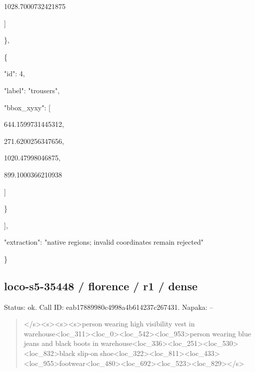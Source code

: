 \documentclass[10pt,a4paper]{article}
\begin{document}
        1028.7000732421875\par
      ]\par
    \},\allowbreak{}\par
    \{\par
      "id":\allowbreak{} 4,\allowbreak{}\par
      "label":\allowbreak{} "trousers",\allowbreak{}\par
      "bbox\_xyxy":\allowbreak{} [\par
        644.1599731445312,\allowbreak{}\par
        271.6200256347656,\allowbreak{}\par
        1020.47998046875,\allowbreak{}\par
        899.1000366210938\par
      ]\par
    \}\par
  ],\allowbreak{}\par
  "extraction":\allowbreak{} "native regions; invalid coordinates remain rejected"\par
\}
\subsection*{loco-s5-35448 / florence / r1 / dense}
Status: ok. Call ID: eab17889980c4998a4b614237c267431. Napaka: --
\begin{quote}\footnotesize
</s>\allowbreak{}<s>\allowbreak{}<s>\allowbreak{}<s>\allowbreak{}person wearing high visibility vest in warehouse<loc\_311>\allowbreak{}<loc\_0>\allowbreak{}<loc\_54\allowbreak{}2>\allowbreak{}<loc\_953>\allowbreak{}person wearing blue jeans and black boots in warehouse<loc\_336>\allowbreak{}<loc\_251>\allowbreak{}<loc\_\allowbreak{}530>\allowbreak{}<loc\_832>\allowbreak{}black slip-on shoe<loc\_322>\allowbreak{}<loc\_811>\allowbreak{}<loc\_433>\allowbreak{}<\allowbreak{}loc\_955>\allowbreak{}footwear<loc\_480>\allowbreak{}<loc\_69\allowbreak{}2>\allowbreak{}<loc\_523>\allowbreak{}<loc\_829>\allowbreak{}</s>\allowbreak{}
\end{quote}
\end{document}
